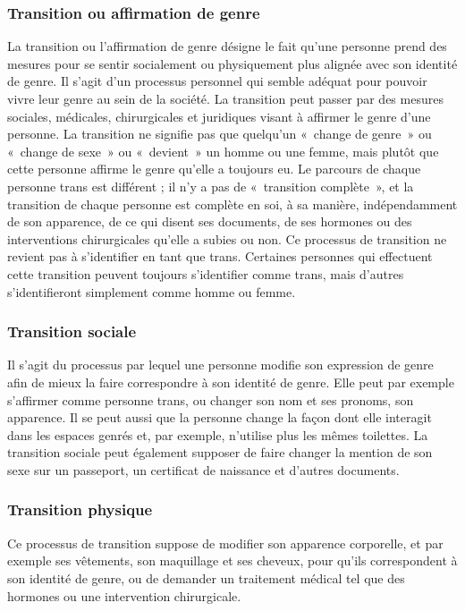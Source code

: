 \documentclass[12pt,openany]{book}
\begin{document}
\subsubsection*{Transition ou affirmation de genre}

\noindent La transition ou l’affirmation de genre désigne le fait qu’une personne prend des mesures pour se sentir socialement ou physiquement plus alignée avec son identité de genre. Il s’agit d’un processus personnel qui semble adéquat pour pouvoir vivre leur genre au sein de la société. La transition peut passer par des mesures sociales, médicales, chirurgicales et juridiques visant à affirmer le genre d’une personne. La transition ne signifie pas que quelqu’un \mbox{« c}hange de genr\mbox{e »} ou \mbox{« c}hange de sex\mbox{e »} ou \mbox{« devient »} un homme ou une femme, mais plutôt que cette personne affirme le genre qu’elle a toujours eu. Le parcours de chaque personne trans est différent ; il n’y a pas de \mbox{« t}ransition complèt\mbox{e »}, et la transition de chaque personne est complète en soi, à sa manière, indépendamment de son apparence, de ce qui disent ses documents, de ses hormones ou des interventions chirurgicales qu’elle a subies ou non. Ce processus de transition ne revient pas à s’identifier en tant que trans. Certaines personnes qui effectuent cette transition peuvent toujours s’identifier comme trans, mais d’autres s’identifieront simplement comme homme ou femme.

\subsubsection*{Transition sociale}

\noindent Il s’agit du processus par lequel une personne modifie son expression de genre afin de mieux la faire correspondre à son identité de genre. Elle peut par exemple s’affirmer comme personne trans, ou changer son nom et ses pronoms, son apparence. Il se peut aussi que la personne change la façon dont elle interagit dans les espaces genrés et, par exemple, n’utilise plus les mêmes toilettes. La transition sociale peut également supposer de faire changer la mention de son sexe sur un passeport, un certificat de naissance et d’autres documents.

\subsubsection*{Transition physique}

\noindent Ce processus de transition suppose de modifier son apparence corporelle, et par exemple ses vêtements, son maquillage et ses cheveux, pour qu’ils correspondent à son identité de genre, ou de demander un traitement médical tel que des hormones ou une intervention chirurgicale.
\end{document}
